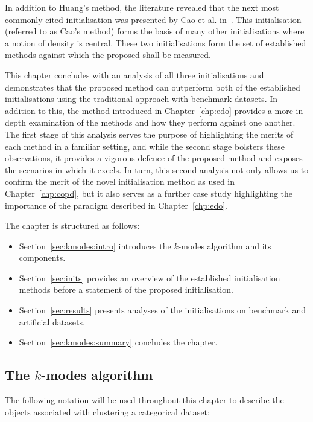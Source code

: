 In addition to Huang's method, the literature revealed that the next most
commonly cited initialisation was presented by Cao et al. in~\cite{Cao2009}.
This initialisation (referred to as Cao's method) forms the basis of many other
initialisations where a notion of density is central. These two initialisations
form the set of established methods against which the proposed shall be
measured.

This chapter concludes with an analysis of all three initialisations and
demonstrates that the proposed method can outperform both of the established
initialisations using the traditional approach with benchmark datasets. In
addition to this, the method introduced in Chapter~\ref{chp:edo} provides a more
in-depth examination of the methods and how they perform against one another.
The first stage of this analysis serves the purpose of highlighting the merits
of each method in a familiar setting, and while the second stage bolsters these
observations, it provides a vigorous defence of the proposed method and exposes
the scenarios in which it excels. In turn, this second analysis not only allows
us to confirm the merit of the novel initialisation method as used in
Chapter~\ref{chp:copd}, but it also serves as a further case study highlighting
the importance of the paradigm described in Chapter~\ref{chp:edo}.

The chapter is structured as follows:
\begin{itemize}
    \item Section~\ref{sec:kmodes:intro} introduces the \(k\)-modes algorithm
        and its components.
    \item Section~\ref{sec:inits} provides an overview of the established
        initialisation methods before a statement of the proposed
        initialisation.
    \item Section~\ref{sec:results} presents analyses of the initialisations on
        benchmark and artificial datasets.
    \item Section~\ref{sec:kmodes:summary} concludes the chapter.
\end{itemize}


\subsection{The \(k\)-modes algorithm}\label{subsec:kmodes}

The following notation will be used throughout this chapter to describe the
objects associated with clustering a categorical dataset:

